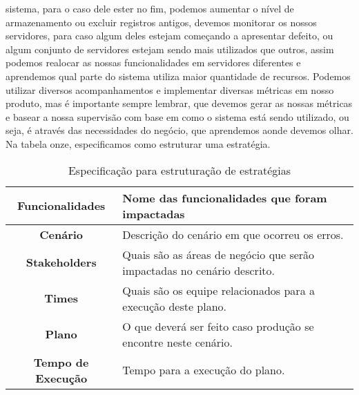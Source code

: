       sistema, para o caso dele ester no fim, podemos aumentar o nível de armazenamento
      ou excluir registros antigos, devemos monitorar os nossos servidores, para
      caso algum deles estejam começando a apresentar defeito, ou algum conjunto
      de servidores estejam sendo mais utilizados que outros, assim podemos realocar
      as nossas funcionalidades em servidores diferentes e aprendemos qual parte
      do sistema utiliza maior quantidade de recursos. Podemos utilizar diversos
      acompanhamentos e implementar diversas métricas em nosso produto, mas é
      importante sempre lembrar, que devemos gerar as nossas métricas e basear a
      nossa supervisão com base em como o sistema está sendo utilizado, ou seja,
      é através das necessidades do negócio, que aprendemos aonde devemos olhar.
      Na tabela onze, especificamos como estruturar uma estratégia.\newline

      \begin{table}[h!]
        \centering
        \begin{tabular}{|c|p{10cm}|}
          \hline
          \textbf{Funcionalidades} &
          Nome das funcionalidades que foram impactadas \\ \hline
          \textbf{Cenário} &
          Descrição do cenário em que ocorreu os erros. \\ \hline
          \textbf{Stakeholders} &
          Quais são as áreas de negócio que serão impactadas no cenário descrito. \\ \hline
          \textbf{Times} &
          Quais são os equipe relacionados para a execução deste plano. \\ \hline
          \textbf{Plano} &
          O que deverá ser feito caso produção se encontre neste cenário. \\ \hline
          \textbf{Tempo de Execução} &
          Tempo para a execução do plano. \\ \hline
        \end{tabular}
        \caption{Especificação para estruturação de estratégias}
        \label{Tabela:11}
      \end{table}

